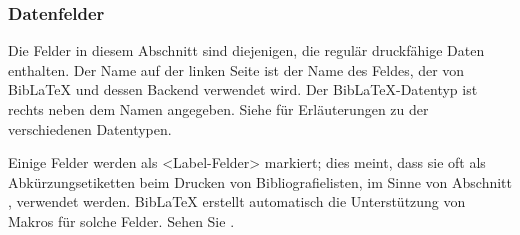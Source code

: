 \documentclass{ltxdockit}[2011/03/25]
\newcommand*{\biblatex}{BibLaTeX\xspace}
\begin{document}
\subsubsection{Datenfelder} \label{bib:fld:dat}

Die Felder in diesem Abschnitt sind diejenigen, die regulär druckfähige Daten
enthalten. Der Name auf der linken Seite ist der Name des Feldes, der von
\biblatex und dessen Backend verwendet wird. Der \biblatex-Datentyp ist
rechts neben dem Namen angegeben. Siehe  für Erläuterungen zu
der verschiedenen Datentypen.

Einige Felder werden als <Label-Felder> markiert; dies meint,
dass sie oft als Abkürzungsetiketten beim Drucken von Bibliografielisten, im Sinne von 
Abschnitt , verwendet werden. \biblatex erstellt automatisch die Unterstützung von Makros für solche Felder. Sehen Sie .
\end{document}
